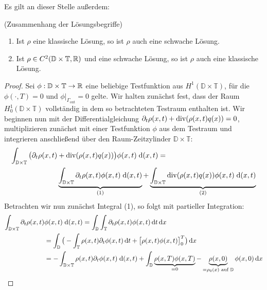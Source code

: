 Es gilt an dieser Stelle außerdem:

\begin{Lemma}(Zusammenhang der Lösungsbegriffe)
	\begin{enumerate}
		\item Ist $ \rho $ eine klassische Lösung, so ist $ \rho $ auch eine schwache Lösung.
		\item Ist $ \rho \in C^2(\mathbb{D} \times \mathbb{T} , \mathbb{R} )$ und eine schwache Lösung, so ist $ \rho $ auch eine klassische Lösung. 
	\end{enumerate}
\end{Lemma}

\begin{proof}
	Sei $ \phi : \mathbb{D} \times \mathbb{T} \to \mathbb{R} $ eine beliebige Testfunktion aus  $H^1(\mathbb{D} \times \mathbb{T}) $, für die $ \phi(\cdot,T) = 0 $ und $ \phi|_{\Gamma_{\text{out}}} = 0 $ gelte. Wir halten zunächst fest, dass der Raum $ H_0^1(\mathbb{D} \times \mathbb{T}) $ vollständig in dem so betrachteten Testraum enthalten ist.
	Wir beginnen nun mit der Differentialgleichung $ \partial_t \rho(x,t) + \operatorname{div}(\rho(x,t) q(x)) = 0  $, multiplizieren zunächst mit einer Testfunktion $ \phi $ aus dem Testraum und integrieren anschließend über den Raum-Zeitzylinder $ \mathbb{D} \times \mathbb{T} $:
	\begin{align*}
	\int_{\mathbb{D} \times \mathbb{T}} \big(\partial_t \rho(x,t) &+ \operatorname{div}(\rho(x,t) q(x) ) \big) \phi(x,t) \; \mathrm{d} (x,t) =  \\
	&\underbrace{\int_{\mathbb{D} \times \mathbb{T}}  \partial_t \rho(x,t) \phi(x,t) \; \mathrm{d} (x,t)}_{(1)} +\underbrace{\int_{\mathbb{D} \times \mathbb{T}}  
		\operatorname{div}(\rho(x,t) q(x) ) \phi(x,t)\; \mathrm{d} (x,t)}_{(2)}
	\end{align*}
	Betrachten wir nun zunächst Integral (1), so folgt mit partieller Integration:
	\begin{align*}
	\int_{\mathbb{D} \times \mathbb{T}}  \partial_t \rho(x,t) &\phi(x,t) \; \mathrm{d} (x,t) = \int_{\mathbb{D}} \int_{\mathbb{T}} \partial_t \rho(x,t) \phi(x,t) \dt \dx \\&= \int_{\mathbb{D}} \big( - \int_{\mathbb{T}} \rho(x,t) \partial_t \phi(x,t) \dt + \big[ \rho(x,t) \phi(x,t) \big]_0^T  \big) \dx \\
	&= - \int_{\mathbb{D} \times \mathbb{T}} \rho(x,t) \partial_t \phi(x,t) \; \mathrm{d} (x,t) + \int_{\mathbb{D}} \underbrace{\rho(x,T) \phi(x,T)}_{ = 0 } - \underbrace{\rho(x,0)}_{ = \rho_0(x) \text{ auf } \mathbb{D}} \phi(x,0)  \dx\\

\end{align*}
\end{proof}
